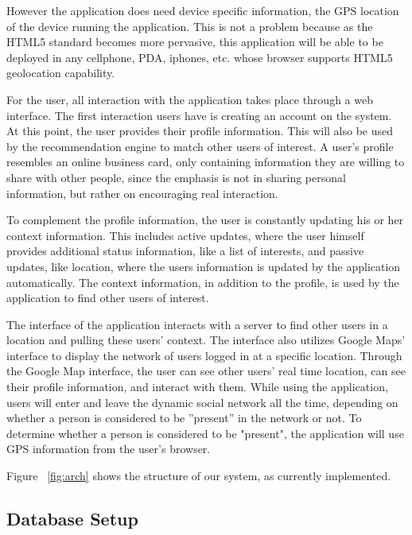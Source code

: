 \documentclass[11pt]{article}
\begin{document}
However the application does need device specific information, the GPS location of the device running the application. This is not a problem because as the HTML5 standard becomes more pervasive, this application will be able to be deployed in any cellphone, PDA, iphones, etc. whose browser supports HTML5 geolocation capability.

For the user, all interaction with the application takes place through a web interface. The first interaction users have is creating an account on the system. At this point, the user provides their profile information. This will also be used by the recommendation engine to match other users of interest. A user's profile resembles an online business card, only containing information they are willing to share with other people, since the emphasis is not in sharing personal information, but rather on encouraging real interaction. 

To complement the profile information, the user is constantly updating his or her context information. This includes active updates, where the user himself provides additional status information, like a list of interests, and passive updates, like location, where the users information is updated by the application automatically. The context information, in addition to the profile, is used by the application to find other users of interest. 

The interface of the application interacts with a server to find other users in a location and pulling these users' context. The interface also utilizes Google Maps' interface to display the network of users logged in at a specific location. Through the Google Map interface, the user can see other users' real time location, can see their profile information, and interact with them. While using the application, users will enter and leave the dynamic social network all the time, depending on whether a person is considered to be ''present'' in the network or not. To determine whether a person is considered to be "present", the application will use GPS information from the user's browser.





Figure ~\ref{fig:arch} shows the structure of our system, as currently implemented. 


\subsection{Database Setup}
\end{document}
